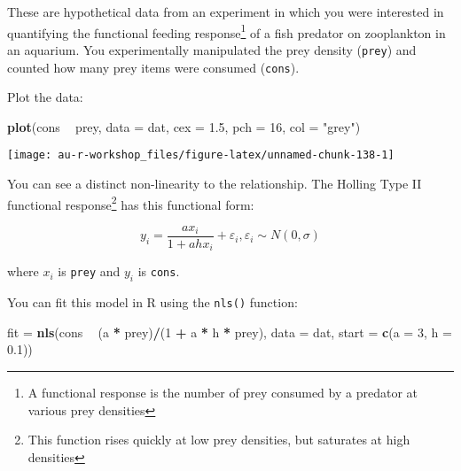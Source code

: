 \documentclass[]{book}
\newenvironment{Shaded}{\begin{snugshade}}{\end{snugshade}}
\newcommand{\KeywordTok}[1]{\textcolor[rgb]{0.13,0.29,0.53}{\textbf{#1}}}
\newcommand{\DataTypeTok}[1]{\textcolor[rgb]{0.13,0.29,0.53}{#1}}
\newcommand{\DecValTok}[1]{\textcolor[rgb]{0.00,0.00,0.81}{#1}}
\newcommand{\FloatTok}[1]{\textcolor[rgb]{0.00,0.00,0.81}{#1}}
\newcommand{\StringTok}[1]{\textcolor[rgb]{0.31,0.60,0.02}{#1}}
\newcommand{\OperatorTok}[1]{\textcolor[rgb]{0.81,0.36,0.00}{\textbf{#1}}}
\newcommand{\NormalTok}[1]{#1}
\let\rmarkdownfootnote\footnote%
\def\footnote{\protect\rmarkdownfootnote}
\theoremstyle{definition}
\theoremstyle{definition}
\theoremstyle{definition}
\theoremstyle{remark}
\begin{document}
These are hypothetical data from an experiment in which you were
interested in quantifying the functional feeding response\footnote{A
  functional response is the number of prey consumed by a predator at
  various prey densities} of a fish predator on zooplankton in an
aquarium. You experimentally manipulated the prey density
(\texttt{prey}) and counted how many prey items were consumed
(\texttt{cons}).

Plot the data:

\begin{Shaded}
\begin{Highlighting}[]
\KeywordTok{plot}\NormalTok{(cons }\OperatorTok{~}\StringTok{ }\NormalTok{prey, }\DataTypeTok{data =}\NormalTok{ dat, }\DataTypeTok{cex =} \FloatTok{1.5}\NormalTok{, }\DataTypeTok{pch =} \DecValTok{16}\NormalTok{, }\DataTypeTok{col =} \StringTok{"grey"}\NormalTok{)}
\end{Highlighting}
\end{Shaded}

\begin{center}\texttt{[image: au-r-workshop\_files/figure-latex/unnamed-chunk-138-1]} \end{center}

You can see a distinct non-linearity to the relationship. The Holling
Type II functional response\footnote{This function rises quickly at low
  prey densities, but saturates at high densities} has this functional
form:

\begin{equation}
  y_i=\frac{ax_i}{1+ahx_i} + \varepsilon_i, \varepsilon_i \sim N(0, \sigma)
\label{eq:func-resp}
\end{equation}

where \(x_i\) is \texttt{prey} and \(y_i\) is \texttt{cons}.

You can fit this model in R using the \texttt{nls()} function:

\begin{Shaded}
\begin{Highlighting}[]
\NormalTok{fit =}\StringTok{ }\KeywordTok{nls}\NormalTok{(cons }\OperatorTok{~}\StringTok{ }\NormalTok{(a }\OperatorTok{*}\StringTok{ }\NormalTok{prey)}\OperatorTok{/}\NormalTok{(}\DecValTok{1} \OperatorTok{+}\StringTok{ }\NormalTok{a }\OperatorTok{*}\StringTok{ }\NormalTok{h }\OperatorTok{*}\StringTok{ }\NormalTok{prey), }\DataTypeTok{data =}\NormalTok{ dat,}
          \DataTypeTok{start =} \KeywordTok{c}\NormalTok{(}\DataTypeTok{a =} \DecValTok{3}\NormalTok{, }\DataTypeTok{h =} \FloatTok{0.1}\NormalTok{))}
\end{Highlighting}
\end{Shaded}
\end{document}
